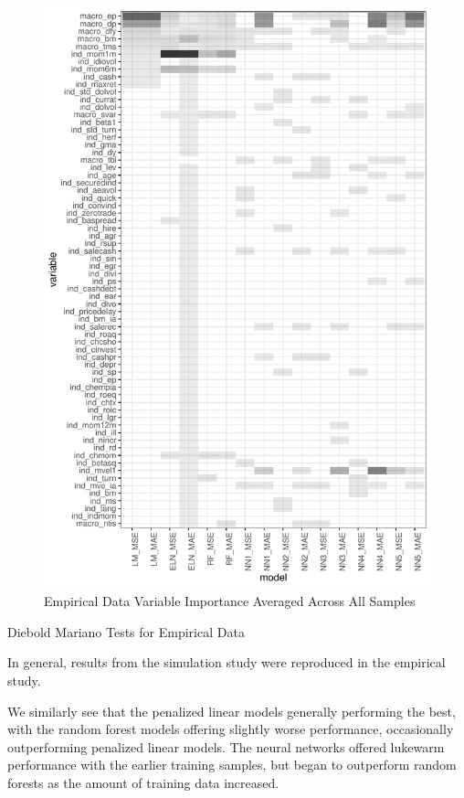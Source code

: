 \documentclass[a4paper, table]{article}
\begin{document}
\begin{figure}
	\includegraphics{empirical_sample_all_vi.pdf}
	\caption{Empirical Data Variable Importance Averaged Across All Samples}
\end{figure}
	

\begin{table}
	\caption{Diebold Mariano Tests for Empirical Data}
\end{table}

In general, results from the simulation study were reproduced in the empirical study. 

We similarly see that the penalized linear models generally performing the best, with the random forest models offering slightly worse performance, occasionally outperforming penalized linear models. The neural networks offered lukewarm performance with the earlier training samples, but began to outperform random forests as the amount of training data increased.
\end{document}
